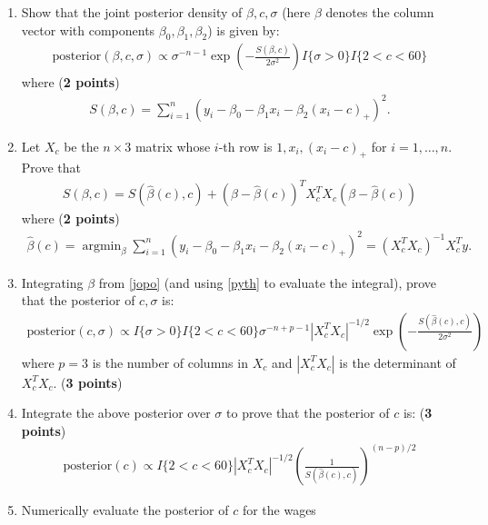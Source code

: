 \documentclass{scrartcl}
\def\argmin{\mathop{\text{argmin}}}
\begin{document}
\begin{enumerate}
  \begin{enumerate}
  \item Show that the joint posterior density of $\beta, c, \sigma$ (here
    $\beta$ denotes the column vector with components $\beta_0,
    \beta_1, \beta_2$) is given by:
    \begin{align}\label{jopo}
      \text{posterior}(\beta, c, \sigma) \propto \sigma^{-n-1} \exp
      \left(-\frac{S(\beta, c)}{2 \sigma^2} \right) I\{\sigma > 0\}
      I\{2 < c < 60\}
    \end{align}
    where (\textbf{2 points})
    \begin{align*}
      S(\beta, c) = \sum_{i=1}^n \left(y_i - \beta_0 - \beta_1 x_i -
      \beta_2 (x_i - c)_+ \right)^2. 
    \end{align*}
  \item Let $X_c$ be the $n \times 3$ matrix whose $i$-th row is $1,
    x_i, (x_i - c)_+$ for $i = 1, \dots, n$. Prove that
    \begin{align}\label{pyth}
      S(\beta, c) = S(\hat{\beta}(c), c) + \left(\beta -
      \hat{\beta}(c) \right)^T X_c^T X_c  \left(\beta - \hat{\beta}(c)
      \right) 
    \end{align}
    where (\textbf{2 points})
    \begin{align*}
      \hat{\beta}(c) = \argmin_{\beta} \sum_{i=1}^n \left(y_i -
      \beta_0 - \beta_1 x_i - 
      \beta_2 (x_i - c)_+ \right)^2  = (X_c^T X_c)^{-1} X_c^T y. 
    \end{align*}
  \item Integrating $\beta$ from \eqref{jopo} (and using \eqref{pyth}
    to evaluate the integral), prove that the posterior of $c, \sigma$
    is: 
    \begin{align*}
      \text{posterior}(c, \sigma) \propto I\{\sigma > 0\}
      I\{2 < c < 60\} \sigma^{-n+p-1} |X_c^T X_c|^{-1/2} \exp
      \left(-\frac{S(\hat{\beta}(c), c)}{2 \sigma^2} \right)
    \end{align*}
    where $p = 3$ is the number of columns in $X_c$ and $|X_c^T X_c|$
    is the determinant of $X_c^T X_c$. (\textbf{3
      points})
  \item Integrate the above posterior over $\sigma$ to prove that the
    posterior of $c$ is: (\textbf{3 points})
    \begin{align*}
      \text{posterior}(c) \propto I\{2 < c < 60\} |X_c^T X_c|^{-1/2}
      \left(\frac{1}{S(\hat{\beta}(c), c)} \right)^{(n-p)/2}
    \end{align*}
  \item Numerically evaluate the posterior of $c$ for the wages

\end{enumerate}
\end{enumerate}
\end{document}
